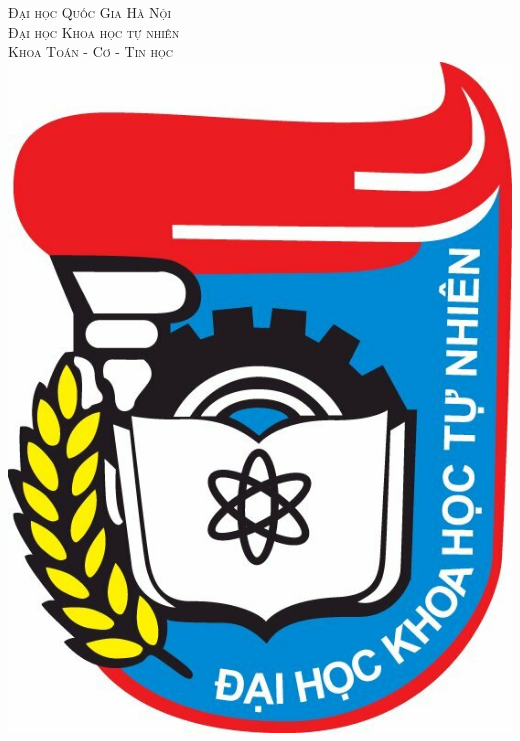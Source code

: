 \documentclass[14pt, a4paper]{article}
\theoremstyle{sltheorem}
\theoremstyle{soltheorem}
\begin{document}
    \begin{titlepage}

        \newcommand{\HRule}{\rule{\linewidth}{0.5mm}} %

        \center %

        \textsc{\LARGE Đại học Quốc Gia Hà Nội}\\[0.5cm]
        \textsc{\LARGE Đại học Khoa học tự nhiên}\\[0.5cm] %
        \textsc{\LARGE Khoa Toán - Cơ - Tin học}\\[0.5cm]

        \includegraphics[scale=0.2]{HUS-logo.jpg}\\[0.5cm]


\end{titlepage}
\end{document}
